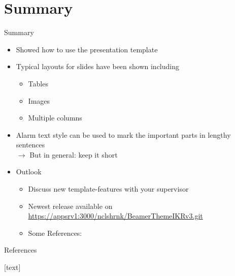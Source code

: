 \documentclass[english,american,german,aspectratio=43]{beamer}
\begin{document}
\section{Summary}
\begin{frame}{Summary}

  \begin{itemize}
    \item Showed how to use the \alert{presentation template}
    \item \alert{Typical layouts} for slides have been shown including

      \begin{itemize}
        \item Tables
        \item Images
        \item Multiple columns
      \end{itemize}
    \item Alarm text style can be used to mark the \alert{important parts}
      in lengthy sentences\\
      $\mathit{\rightarrow}$ But in general: keep it short
  \end{itemize}
  \medskip{}

  \begin{itemize}
    \item Outlook

      \begin{itemize}
        \item Discuss new template-features with your supervisor
        \item Newest release available on
          \url{https://appsrv1:3000/nclshrnk/BeamerThemeIKRv3.git}
        \item Some References:
          \cite{Kuo:1981,IEEE:14/1193r0,IEEE:15/0919r1,Jones:2015,Ling:2015,Yang:2015,Zhang:2015}
      \end{itemize}
  \end{itemize}
\end{frame}
\breadcrumbsoff

\begin{frame}[noframenumbering]{References}

  \vspace{-2.15em}
  \begin{multicols}{2}
    [text]

    {\scriptsize{}
      
    }{\scriptsize\par}

  \end{multicols}

  \beginbackup
\end{frame}
\end{document}
